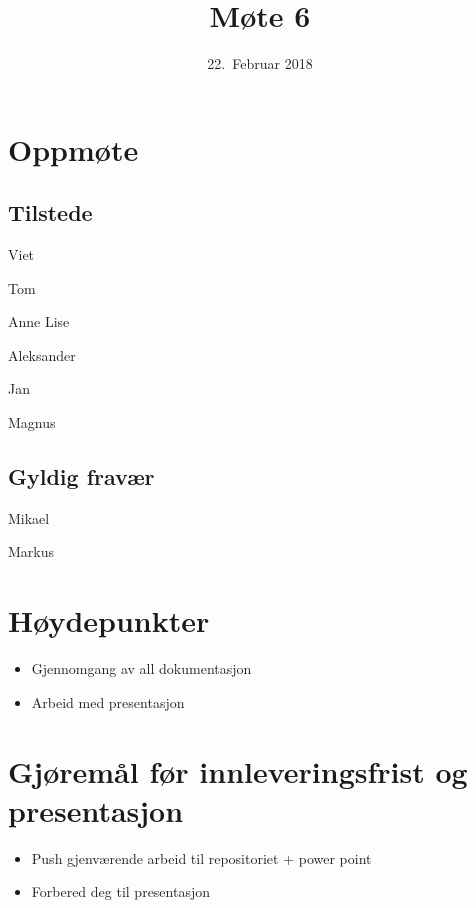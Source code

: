 \documentclass[letterpaper,11pt]{article}
\title{Møte 6}
\date{22.~Februar 2018}
\begin{document}
\maketitle
\section*{Oppmøte}
\subsection*{Tilstede}
\begin{list}{}{}
	\item Viet
	\item Tom
	\item Anne Lise
	\item Aleksander
	\item Jan
	\item Magnus
\end{list}
\subsection*{Gyldig fravær}
\begin{list}{}{}
	\item Mikael
	\item Markus
\end{list}

\newpage
\section*{Høydepunkter}
\begin{itemize}
	\item Gjennomgang av all dokumentasjon
	\item Arbeid med presentasjon
\end{itemize}

\section*{Gjøremål før innleveringsfrist og presentasjon}
\begin{itemize}
	\item Push gjenværende arbeid til repositoriet + power point
	\item Forbered deg til presentasjon
\end{itemize}
\end{document}
